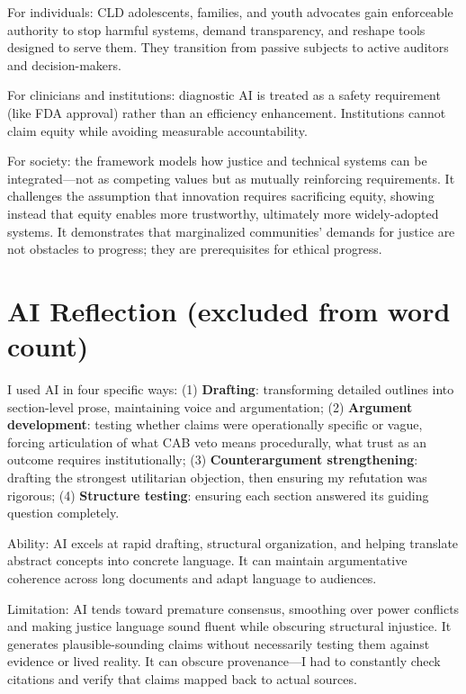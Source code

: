 \documentclass[12pt,a4paper]{article}
\begin{document}
For individuals: CLD adolescents, families, and youth advocates gain enforceable authority to stop harmful systems, demand transparency, and reshape tools designed to serve them. They transition from passive subjects to active auditors and decision-makers.

For clinicians and institutions: diagnostic AI is treated as a safety requirement (like FDA approval) rather than an efficiency enhancement. Institutions cannot claim equity while avoiding measurable accountability.

For society: the framework models how justice and technical systems can be integrated—not as competing values but as mutually reinforcing requirements. It challenges the assumption that innovation requires sacrificing equity, showing instead that equity enables more trustworthy, ultimately more widely-adopted systems. It demonstrates that marginalized communities' demands for justice are not obstacles to progress; they are prerequisites for ethical progress.

\section*{AI Reflection (excluded from word count)}

I used AI in four specific ways: (1) \textbf{Drafting}: transforming detailed outlines into section-level prose, maintaining voice and argumentation; (2) \textbf{Argument development}: testing whether claims were operationally specific or vague, forcing articulation of what CAB veto means procedurally, what trust as an outcome requires institutionally; (3) \textbf{Counterargument strengthening}: drafting the strongest utilitarian objection, then ensuring my refutation was rigorous; (4) \textbf{Structure testing}: ensuring each section answered its guiding question completely.

Ability: AI excels at rapid drafting, structural organization, and helping translate abstract concepts into concrete language. It can maintain argumentative coherence across long documents and adapt language to audiences.

Limitation: AI tends toward premature consensus, smoothing over power conflicts and making justice language sound fluent while obscuring structural injustice. It generates plausible-sounding claims without necessarily testing them against evidence or lived reality. It can obscure provenance—I had to constantly check citations and verify that claims mapped back to actual sources.
\end{document}
